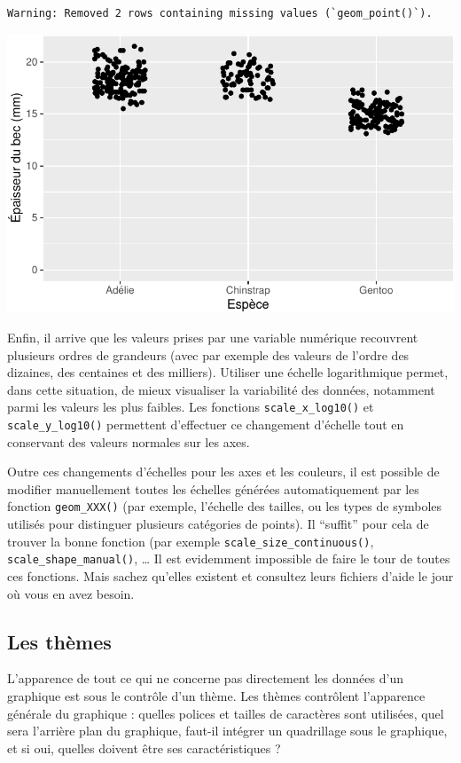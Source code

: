 \documentclass[
  a4paper,
  DIV=11,
  numbers=noendperiod,
  oneside]{scrreprt}
\begin{document}
\begin{verbatim}
Warning: Removed 2 rows containing missing values (`geom_point()`).
\end{verbatim}

\includegraphics{03-visualization_files/figure-pdf/unnamed-chunk-107-1.pdf}

Enfin, il arrive que les valeurs prises par une variable numérique
recouvrent plusieurs ordres de grandeurs (avec par exemple des valeurs
de l'ordre des dizaines, des centaines et des milliers). Utiliser une
échelle logarithmique permet, dans cette situation, de mieux visualiser
la variabilité des données, notamment parmi les valeurs les plus
faibles. Les fonctions \texttt{scale\_x\_log10()} et
\texttt{scale\_y\_log10()} permettent d'effectuer ce changement
d'échelle tout en conservant des valeurs normales sur les axes.

Outre ces changements d'échelles pour les axes et les couleurs, il est
possible de modifier manuellement toutes les échelles générées
automatiquement par les fonction \texttt{geom\_XXX()} (par exemple,
l'échelle des tailles, ou les types de symboles utilisés pour distinguer
plusieurs catégories de points). Il ``suffit'' pour cela de trouver la
bonne fonction (par exemple \texttt{scale\_size\_continuous()},
\texttt{scale\_shape\_manual()}, \ldots{} Il est evidemment impossible
de faire le tour de toutes ces fonctions. Mais sachez qu'elles existent
et consultez leurs fichiers d'aide le jour où vous en avez besoin.

\subsection{Les thèmes}\label{les-thuxe8mes}

L'apparence de tout ce qui ne concerne pas directement les données d'un
graphique est sous le contrôle d'un thème. Les thèmes contrôlent
l'apparence générale du graphique : quelles polices et tailles de
caractères sont utilisées, quel sera l'arrière plan du graphique,
faut-il intégrer un quadrillage sous le graphique, et si oui, quelles
doivent être ses caractéristiques ?
\end{document}
